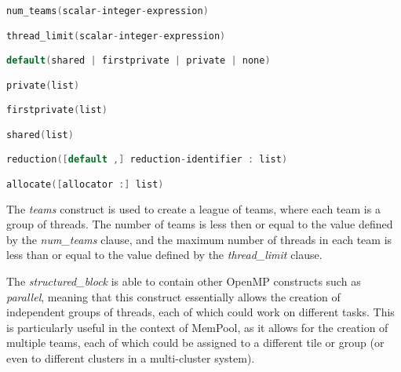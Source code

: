 \begin{lstlisting}[language=C, caption={teams clauses}, label={lst:teams}]
num_teams(scalar-integer-expression)

thread_limit(scalar-integer-expression)

default(shared | firstprivate | private | none)

private(list)

firstprivate(list)

shared(list)

reduction([default ,] reduction-identifier : list)

allocate([allocator :] list)
\end{lstlisting}

The \emph{teams} construct is used to create a league of teams, where each team is a group of
threads. The number of teams is less then or equal to the value defined by the \emph{num\_teams}
clause, and the maximum number of threads in each team is less than or equal to the value defined by
the \emph{thread\_limit} clause.

The \emph{structured_block} is able to contain other OpenMP constructs such as \emph{parallel},
meaning that this construct essentially allows the creation of independent groups of threads, each
of which could work on different tasks. This is particularly useful in the context of MemPool, as
it allows for the creation of multiple teams, each of which could be assigned to a different tile or
group (or even to different clusters in a multi-cluster system).

